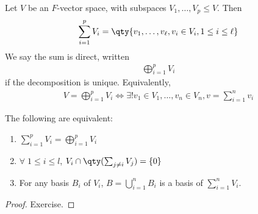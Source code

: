 \begin{definition}
    Let $V$ be an $F$-vector space, with subspaces $V_1, \dots, V_p \leq V$.
    Then
    \begin{align*}
        \sum_{i=1}^p V_i = \qty{ v_1, \dots, v_\ell, v_i \in V_i, 1 \leq i \leq \ell}
    \end{align*}
    We say the sum is direct, written
    \begin{align*}
        \bigoplus_{i=1}^p V_i
    \end{align*}
    if the decomposition is unique.
    Equivalently,
    \begin{align*}
        V = \bigoplus_{i=1}^p V_i \iff \exists!
        v_1 \in V_1, \dots, v_n \in V_n, v = \sum_{i=1}^n v_i
    \end{align*}
\end{definition}
\begin{lemma}
    The following are equivalent:
    \begin{enumerate}
        \item $\sum_{i=1}^p V_i = \bigoplus_{i=1}^p V_i$
        \item $\forall \; 1 \leq i \leq l$, $V_i \cap \qty( \sum_{j \neq i} V_j ) = \{0\}$
        \item For any basis $B_i$ of $V_i$, $B = \bigcup_{i=1}^n B_i$ is a basis of $\sum_{i=1}^n V_i$.
    \end{enumerate}
\end{lemma}
\begin{proof}
    Exercise.
\end{proof}